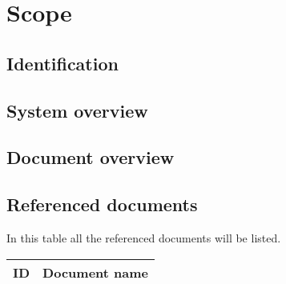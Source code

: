 
\chapter{Scope}
\label{chp:scope}

\section{Identification}

\section{System overview}

\section{Document overview}

\section{Referenced documents}
In this table all the referenced documents will be listed.

\begin{tabular}{b{6cm} b{7cm}}
	\textbf{ID} & \textbf{Document name} \\
	\hline
\end{tabular}